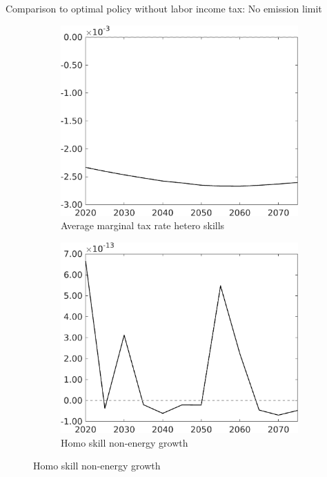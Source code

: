 \documentclass[11pt,aspectratio=169]{beamer}
\begin{document}
\begin{frame}{Comparison to optimal policy without labor income tax: No emission limit}
\begin{figure}[h!!]
\begin{subfigure}{0.32\textwidth}
		\end{subfigure}	
	\begin{subfigure}{0.32\textwidth}		
		\caption{Average marginal tax rate hetero skills}
		\includegraphics[width=1\textwidth]{../codding_model/own_basedOnFried/optimalPol_010922_revision/figures/all_13Sept22_Tplus30/dTaulAv_OPT_NOT_NoTaus_COMPtaul_regime4_spillover0_knspil0_noskill0_sep0_xgrowth0_PV1_etaa0.79_lgd0.png}
	\end{subfigure}		\begin{subfigure}{0.32\textwidth}		
	\caption{Homo skill non-energy growth}
	\includegraphics[width=1\textwidth]{../codding_model/own_basedOnFried/optimalPol_010922_revision/figures/all_13Sept22_Tplus30/gAn_OPT_NOT_NoTaus_COMPtaulPer_regime4_spillover0_knspil0_noskill1_sep0_xgrowth0_PV1_etaa0.79.png}

\end{subfigure}
\end{figure}
\end{frame}
\end{document}
